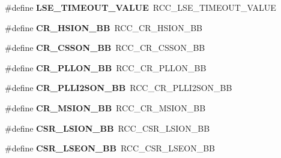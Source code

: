 \begin{DoxyCompactItemize}
\#define {\bfseries L\+S\+E\+\_\+\+T\+I\+M\+E\+O\+U\+T\+\_\+\+V\+A\+L\+UE}~R\+C\+C\+\_\+\+L\+S\+E\+\_\+\+T\+I\+M\+E\+O\+U\+T\+\_\+\+V\+A\+L\+UE
\item 
\mbox{\label{group___h_a_l___r_c_c___aliased_gac3290a833c0e35ec17d32c2d494e6133}} 
\#define {\bfseries C\+R\+\_\+\+H\+S\+I\+O\+N\+\_\+\+BB}~R\+C\+C\+\_\+\+C\+R\+\_\+\+H\+S\+I\+O\+N\+\_\+\+BB
\item 
\mbox{\label{group___h_a_l___r_c_c___aliased_gaca914aed10477ae4090fea0a9639b1ea}} 
\#define {\bfseries C\+R\+\_\+\+C\+S\+S\+O\+N\+\_\+\+BB}~R\+C\+C\+\_\+\+C\+R\+\_\+\+C\+S\+S\+O\+N\+\_\+\+BB
\item 
\mbox{\label{group___h_a_l___r_c_c___aliased_ga3f1fb2589cb8b5ac2f7121aba1135a5f}} 
\#define {\bfseries C\+R\+\_\+\+P\+L\+L\+O\+N\+\_\+\+BB}~R\+C\+C\+\_\+\+C\+R\+\_\+\+P\+L\+L\+O\+N\+\_\+\+BB
\item 
\mbox{\label{group___h_a_l___r_c_c___aliased_ga0c0fb27aba4eb660f7590252596bdfc5}} 
\#define {\bfseries C\+R\+\_\+\+P\+L\+L\+I2\+S\+O\+N\+\_\+\+BB}~R\+C\+C\+\_\+\+C\+R\+\_\+\+P\+L\+L\+I2\+S\+O\+N\+\_\+\+BB
\item 
\mbox{\label{group___h_a_l___r_c_c___aliased_gac80b5fd1d6f839cc29c9272d47742907}} 
\#define {\bfseries C\+R\+\_\+\+M\+S\+I\+O\+N\+\_\+\+BB}~R\+C\+C\+\_\+\+C\+R\+\_\+\+M\+S\+I\+O\+N\+\_\+\+BB
\item 
\mbox{\label{group___h_a_l___r_c_c___aliased_gaa253e36e7e5fb02998c0e4d0388abc52}} 
\#define {\bfseries C\+S\+R\+\_\+\+L\+S\+I\+O\+N\+\_\+\+BB}~R\+C\+C\+\_\+\+C\+S\+R\+\_\+\+L\+S\+I\+O\+N\+\_\+\+BB
\item 
\mbox{\label{group___h_a_l___r_c_c___aliased_ga213e54878ac3849d9ea59567cf73bac2}} 
\#define {\bfseries C\+S\+R\+\_\+\+L\+S\+E\+O\+N\+\_\+\+BB}~R\+C\+C\+\_\+\+C\+S\+R\+\_\+\+L\+S\+E\+O\+N\+\_\+\+BB
\item 
\mbox{\label{group___h_a_l___r_c_c___aliased_gac7c26259006de79c8754693af9712d1a}} 

\end{DoxyCompactItemize}
